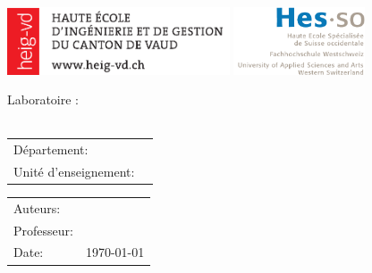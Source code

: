 


\begin{center}
\includegraphics[height=2cm]{./images/logo_heig.pdf}
\hfill \includegraphics[height=2cm]{./images/logo_hesso.pdf}
\end{center}

\vfill

\begin{center}
	\Large Laboratoire \nbrlabo:\\
	\huge \titre \\
\end{center}


\begin{center}
	\begin{tabular}{l l}
		Département:          & \departement\\
		Unité d'enseignement: & \cours\\
	\end{tabular}
\end{center}


\vfill



\begin{tabular}{l l}
	\Large	Auteurs:		& \Large \nomAuteur\\
	Professeur:				& \prof\\
	Date:					& \today\\
\end{tabular}



